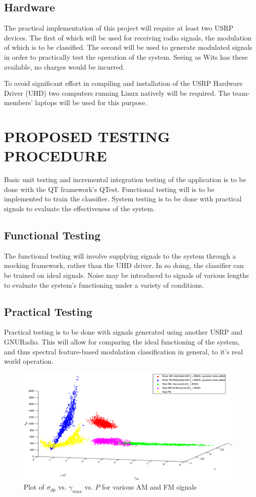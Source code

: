 \documentclass[10pt,onecolumn]{witseiepaper}
\begin{document}
\begin{multicols}{2}
	\subsection{Hardware}
		The practical implementation of this project will require at least two USRP devices. The first of which will be used for receiving radio signals, the modulation of which is to be classified. The second will be used to generate modulated signals in order to practically test the operation of the system. Seeing as Wits has these available, no charges would be incurred.

		To avoid significant effort in compiling and installation of the USRP Hardware Driver (UHD) two computers running Linux natively will be required. The team-members' laptops will be used for this purpose.

\section{PROPOSED TESTING PROCEDURE}
	Basic unit testing and incremental integration testing of the application is to be done with the QT framework's QTest. Functional testing will is to be implemented to train the classifier. System testing is to be done with practical signals to evaluate the effectiveness of the system.
	\subsection{Functional Testing}
		The functional testing will involve supplying signals to the system through a mocking framework, rather than the UHD driver. In so doing, the classifier can be trained on ideal signals. Noise may be introduced to signals of various lengths to evaluate the system's functioning under a variety of conditions.

	\subsection{Practical Testing}
		Practical testing is to be done with signals generated using another USRP and GNURadio. This will allow for comparing the ideal functioning of the system, and thus spectral feature-based modulation classification in general, to it's real world operation.

\end{multicols}
	\begin{figure}[h]
		\centering
		\includegraphics[width=1\textwidth]{plot0.eps}
		\caption{Plot of $\sigma_{dp}$ vs. $\gamma_{max}$ vs. $P$ for various AM and FM signals}
		\label{fig:plot0}
	\end{figure}
\end{document}
